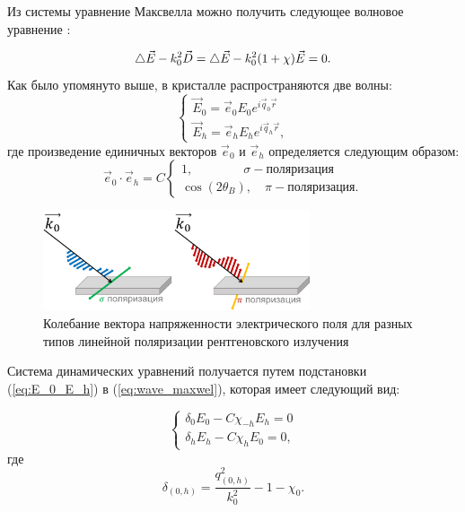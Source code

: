 
 Из системы уравнение Максвелла можно получить следующее волновое уравнение \cite{pinsker1982}:

\begin{equation}
 \mathop{}\!\mathbin\bigtriangleup \vec{E} - k_0^2 \vec{D} = \mathop{}\!\mathbin\bigtriangleup \vec{E} - k_0^2 (1+\chi)\vec{E} = 0.
 \label{eq:wave_maxwel}
\end{equation}
\noindent
Как было упомянуто выше, в кристалле распространяются две волны:
\begin{equation}
 \begin{cases}
   \vec{E}_0 = \vec{e}_0 E_0 e^{i\vec{q}_0\vec{r}}
   \\
   \vec{E}_h = \vec{e}_h E_h e^{i\vec{q}_h\vec{r}},
 \end{cases}
 \label{eq:E_0_E_h}
\end{equation}
\noindent
где произведение единичных векторов $\vec{e}_0$ и $\vec{e}_h$ определяется следующим образом:
\begin{equation}
\vec{e}_0 \cdot \vec{e}_h = C
 \begin{cases}
   1, \quad \quad \quad \quad  \sigma    - \text{поляризация}\\
   \cos(2\theta_B), \quad   \pi - \text{поляризация}.
 \end{cases}
\end{equation}

\begin{figure}[H]
  \centering
  \includegraphics[width=0.7\textwidth]{images/polarize_E.png}
  \caption{ Колебание вектора напряженности электрического поля для разных типов линейной поляризации рентгеновского излучения}
  \label{ris:polarize_E}
\end{figure}

Система динамических уравнений получается путем подстановки (\ref{eq:E_0_E_h}) в (\ref{eq:wave_maxwel}),
которая имеет следующий вид:

\begin{equation}
 \begin{cases}
   \delta_0 E_0 - C\chi_{-h}E_h=0
   \\
   \delta_h E_h - C\chi_{h}E_0=0,
 \end{cases}
\end{equation}
\noindent
где
\begin{equation}
   \delta_{(0,h)} = \frac{q_{(0,h)}^2}{k_0^2}-1-\chi_0.
\end{equation}

